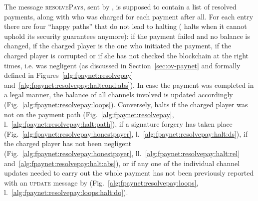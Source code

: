   The message \textsc{resolvePays}, sent by \simulator{}, is supposed to contain
  a list of resolved payments, along with who was charged for each payment after
  all. For each entry there are four ``happy paths'' that do not lead to
  \fpaynet{} halting (\fpaynet{} halts when it cannot uphold its security
  guarantees anymore): if the payment failed and no balance is changed, if the
  charged player is the one who initiated the payment, if the charged player is
  corrupted or if she has not checked the blockchain at the right times, i.e.
  was negligent (as discussed in Section~\ref{sec:ov-paynet} and formally
  defined in Figures~\ref{alg:fpaynet:resolvepay}
  and~\ref{alg:fpaynet:resolvepay:haltcond:abs}). In case the payment was
  completed in a legal manner, the balance of all channels involved is updated
  accordingly (Fig.~\ref{alg:fpaynet:resolvepay:loops}). Conversely, \fpaynet{}
  halts if the charged player was not on the payment path
  (Fig.~\ref{alg:fpaynet:resolvepay},
  l.~\ref{alg:fpaynet:resolvepay:halt:path}), if a signature forgery has taken
  place (Fig.~\ref{alg:fpaynet:resolvepay:honestpayer},
  l.~\ref{alg:fpaynet:resolvepay:halt:ds}), if the charged player has not been
  negligent (Fig.~\ref{alg:fpaynet:resolvepay:honestpayer},
  ll.~\ref{alg:fpaynet:resolvepay:halt:rel}
  and~\ref{alg:fpaynet:resolvepay:halt:abs}), or if any one of the individual
  channel updates needed to carry out the whole payment has not been previously
  reported with an \textsc{update} message by \simulator{}
  (Fig.~\ref{alg:fpaynet:resolvepay:loops},
  l.~\ref{alg:fpaynet:resolvepay:loops:halt:do}).

